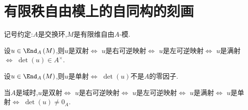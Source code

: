 \section{有限秩自由模上的自同构的刻画}

记号约定:$A$是交换环,$M$是有限维自由$A$-模.

\begin{theorem}{}{}
	设$u\in\End_{A}\left(M\right)$,则$u$是双射$\iff$ $u$是右可逆映射$\iff$ $u$是左可逆映射$\iff$ $u$是满射$\iff$ $\det\left(u\right)\in A^{\times}$.
\end{theorem}

\begin{proposition}{}{}
	设$u\in\End_{A}\left(M\right)$,则$u$是单射$\iff$ $\det\left(u\right)$不是$A$的零因子.
\end{proposition}

\begin{remark}{}{}
	当$A$是域时,$u$是双射$\iff$ $u$是右可逆映射$\iff$ $u$是左可逆映射$\iff$ $u$是满射$\iff$ $u$是单射$\iff$ $\det\left(u\right)\neq 0_{A}$.
\end{remark}




